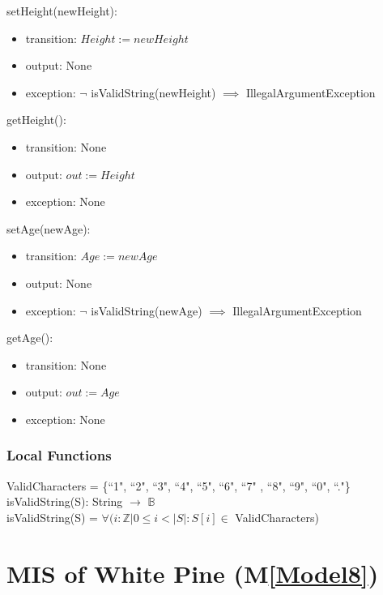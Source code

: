 \documentclass[12pt, titlepage]{article}
\newcommand{\mref}[1]{M\ref{#1}}
\begin{document}
\noindent setHeight(newHeight):
\begin{itemize}
\item transition: $\mathit{Height := newHeight}$
\item output: None
\item exception: $\neg$ isValidString(newHeight) $\implies$
IllegalArgumentException
\end{itemize}

\noindent getHeight():
\begin{itemize}
\item transition: None
\item output: $\mathit{out := Height}$
\item exception: None
\end{itemize}

\noindent setAge(newAge):
\begin{itemize}
\item transition: $\mathit{Age := newAge}$
\item output: None
\item exception: $\neg$ isValidString(newAge) $\implies$
IllegalArgumentException
\end{itemize}

\noindent getAge():
\begin{itemize}
\item transition: None
\item output: $\mathit{out := Age}$
\item exception: None
\end{itemize}

\subsubsection{Local Functions}
ValidCharacters = \{``1", ``2", ``3", ``4", ``5", ``6", ``7"
, ``8", ``9", ``0", ``."\}\\

\noindent isValidString(S): String $\rightarrow$ $\mathbb{B}$ \\

\noindent isValidString(S) = $\forall(i : \mathbb{Z} | 0 \leq
i < |S| : S[i] \in $ ValidCharacters)

\newpage

\renewcommand{\tn}{White Pine }
\renewcommand{\tmn}{WhitePine}
\renewcommand{\constn}{White\ Pine}

\section{MIS of \tn (\mref{Model8})}
\end{document}
